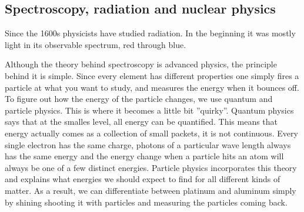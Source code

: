 \subsection*{Spectroscopy, radiation and nuclear physics}
Since the 1600s physicists have studied radiation.
In the beginning it was mostly light in its observable spectrum, red through blue.


Although the theory behind spectroscopy is advanced physics, the principle behind it is simple.
Since every element has different properties one simply fires a particle at what you want to study, and measures the energy when it bounces off.
To figure out how the energy of the particle changes, we use quantum and particle physics.
This is where it becomes a little bit ''quirky''.
Quantum physics says that at the smalles level, all energy can be quantified.
This means that energy actually comes as a collection of small packets, it is not continuous.
Every single electron has the same charge, photons of a particular wave length always has the same energy and the energy change when a particle hits an atom will always be one of a few distinct energies.
Particle physics incorporates this theory and explains what energies we should expect to find for all different kinds of matter.
As a result, we can differentiate between platinum and aluminum simply by shining shooting it with particles and measuring the particles coming back.